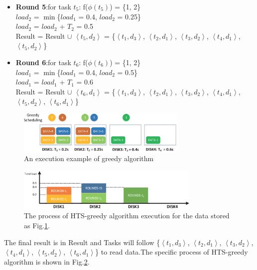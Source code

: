 \documentclass[conference]{IEEEtran}
\begin{document}
\begin{itemize}
	\item \textbf{Round 5}:for task  $t_5$:
	f($\phi(t_5)$) = \{1, 2\}\\
	$load_2$ = $\min$\{$load_1$ = 0.4, $load_2$ = 0.25\}\\
	$load_2$ = $load_2$ + $T_2$ = 0.5\\
	Result = Result $\cup$ $\left \langle t_5, d_{2}\right \rangle$ = \{$\left \langle t_1, d_{3}\right \rangle$, $\left \langle t_2, d_{1}\right \rangle$,  $\left \langle t_3, d_{2}\right \rangle$, $\left \langle t_4, d_{1}\right \rangle$, $\left \langle t_5, d_{2}\right \rangle$\}
	\item \textbf{Round 6}:for task  $t_6$:
	f($\phi(t_6)$) = \{1, 2\}\\
	$load_1$ = $\min$\{$load_1$ = 0.4, $load_2$ = 0.5\}\\
	$load_1$ = $load_1$ + $T_1$ = 0.6\\
	Result = Result $\cup$ $\left \langle t_6, d_{1}\right \rangle$ = \{$\left \langle t_1, d_{3}\right \rangle$, $\left \langle t_2, d_{1}\right \rangle$,  $\left \langle t_3, d_{2}\right \rangle$, $\left \langle t_4, d_{1}\right \rangle$, $\left \langle t_5, d_{2}\right \rangle$, $\left \langle t_6, d_{1}\right \rangle$\}
	
	
	
\end{itemize}
\begin{figure}[!t]
	\centering
	\includegraphics[height=0.8in]{fig1_8.eps}
	\caption{An execution example of greedy algorithm  }
	\label{fig1}
\end{figure}
\begin{figure}[!t]
	\centering
	\includegraphics[height=0.8in]{fig2_1.eps}
	\caption{The process of HTS-greedy algorithm execution for the data stored as Fig.\ref{fig1}. }
	\label{fig2}
\end{figure}

The final result is in Result and  Tasks will follow \{$\left \langle t_1, d_{3}\right \rangle$, $\left \langle t_2, d_{1}\right \rangle$,  $\left \langle t_3, d_{2}\right \rangle$, $\left \langle t_4, d_{1}\right \rangle$, $\left \langle t_5, d_{2}\right \rangle$, $\left \langle t_6, d_{1}\right \rangle$\} to read data.The specific process of HTS-greedy algorithm is shown in Fig.\ref{fig2}.
\end{document}
